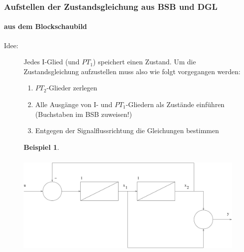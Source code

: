 \message{ !name(Mitschrieb_SysRegel.tex)}\documentclass[12pt,a4paper,ngerman]{scrartcl}
\newtheorem{bsp}{Beispiel}[section] %
\begin{document}
\subsubsection{Aufstellen der Zustandsgleichung aus BSB und DGL}

\paragraph{aus dem Blockschaubild}
\begin{description}
\item[Idee:] Jedes I-Glied (und $PT_1$) speichert einen Zustand. Um die Zustandsgleichung aufzustellen muss also wie folgt vorgegangen werden:
  \begin{enumerate}
  \item $PT_2$-Glieder zerlegen
  \item Alle Ausgänge von I- und $PT_1$-Gliedern als Zustände einführen (Buchstaben im BSB zuweisen!)
  \item Entgegen der Signalflussrichtung die Gleichungen bestimmen
  \end{enumerate}
\end{description}
\begin{figure}[H]
\begin{bsp}
\end{bsp}
  \includegraphics[height=5cm]{sysregel_bsp_2-3}
\end{figure}
\end{document}
